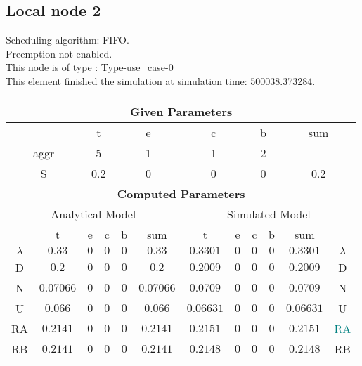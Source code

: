 \documentclass{article}
\begin{document}
\subsection{Local node 2}
Scheduling algorithm: FIFO.\\Preemption not enabled. \\This node is of type : Type-use\_case-0\\
This element finished the simulation at simulation time: 500038.373284.\\
\begin{table}[H]\centering\begin{tabular}{@{}c|cccc|c||cccc|c|c@{}}\toprule\multicolumn{12}{c}{\textbf{Given Parameters}}\\\midrule\multicolumn{2}{c|}{ } & \multicolumn{2}{c}{t} & \multicolumn{2}{c}{e} & \multicolumn{2}{c}{c} & \multicolumn{2}{c}{b} & \multicolumn{2}{|c}{sum} \\\midrule\multicolumn{2}{c|}{aggr} & \multicolumn{2}{c}{5} & \multicolumn{2}{c}{1} & \multicolumn{2}{c}{1} & \multicolumn{2}{c}{2} & \multicolumn{2}{|c}{ } \\ \midrule\multicolumn{2}{c|}{S} & \multicolumn{2}{c}{0.2} & \multicolumn{2}{c}{0} & \multicolumn{2}{c}{0} & \multicolumn{2}{c}{0} & \multicolumn{2}{|c}{0.2}\\ \midrule\midrule\multicolumn{12}{c}{\textbf{Computed Parameters}}\\ \midrule\multicolumn{6}{c||}{Analytical Model} & \multicolumn{6}{c}{Simulated Model}\\ 
 \midrule & t & e & c & b & sum & t & e & c & b & sum &  \\ \midrule$\lambda$ &$0.33$ & $0$ & $0$ & $0$ & $0.33$ & $0.3301$ & $0$ & $0$ & $0$ & $0.3301$& $\lambda$ \\D & $0.2$ & $0$ & $0$ & $0$ & $0.2$ & $0.2009$ & $0$ & $0$ & $0$ & $0.2009$& D\\N & $0.07066$ & $0$ & $0$ & $0$ & $0.07066$ & $0.0709$ & $0$ & $0$ & $0$ & $0.0709$& N\\U & $0.066$ & $0$ & $0$ & $0$ & $0.066$ & $0.06631$ & $0$ & $0$ & $0$ & $0.06631$& U\\RA & $0.2141$ & $0$ & $0$ & $0$ & $0.2141$ & $0.2151$ & $0$ & $0$ & $0$ & $0.2151$& \textcolor{teal}{RA}\\RB & $0.2141$ & $0$ & $0$ & $0$ & $0.2141$ & $0.2148$ & $0$ & $0$ & $0$ & $0.2148$& RB\\
\bottomrule
\end{tabular}
\end{table}
\filbreak
\end{document}
